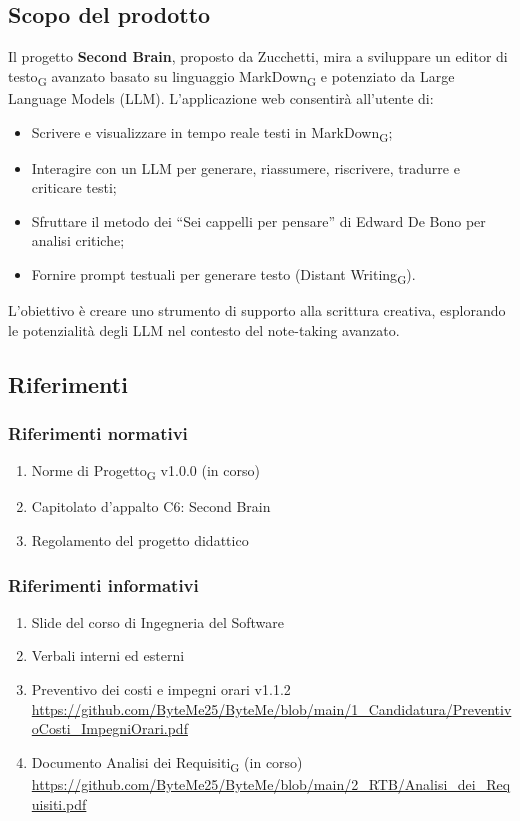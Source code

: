 \documentclass[11pt,a4paper]{article}
\newcommand{\gls}[1]{#1\textsubscript{G}}
\begin{document}
\subsection{Scopo del prodotto}
Il progetto \textbf{Second Brain}, proposto da Zucchetti, mira a sviluppare un \gls{editor di testo} avanzato basato su linguaggio \gls{MarkDown} e potenziato da Large Language Models (LLM). L’applicazione web consentirà all’utente di:
\begin{itemize}
    \item Scrivere e visualizzare in tempo reale testi in \gls{MarkDown};
    \item Interagire con un LLM per generare, riassumere, riscrivere, tradurre e criticare testi;
    \item Sfruttare il metodo dei “Sei cappelli per pensare” di Edward De Bono per analisi critiche;
    \item Fornire prompt testuali per generare testo (\gls{Distant Writing}).
\end{itemize}
L’obiettivo è creare uno strumento di supporto alla scrittura creativa, esplorando le potenzialità degli LLM nel contesto del note-taking avanzato.

\subsection{Riferimenti}
\subsubsection{Riferimenti normativi}
\begin{enumerate}
    \item \gls{Norme di Progetto} v1.0.0 (in corso)
    \item Capitolato d’appalto C6: Second Brain
    \item Regolamento del progetto didattico
\end{enumerate}

\subsubsection{Riferimenti informativi}
\begin{enumerate}
    \item Slide del corso di Ingegneria del Software
    \item Verbali interni ed esterni
    \item Preventivo dei costi e impegni orari v1.1.2 
    \url{https://github.com/ByteMe25/ByteMe/blob/main/1_Candidatura/PreventivoCosti_ImpegniOrari.pdf}
    \item Documento \gls{Analisi dei Requisiti} (in corso) 
    \url{https://github.com/ByteMe25/ByteMe/blob/main/2_RTB/Analisi_dei_Requisiti.pdf}
\end{enumerate}
\end{document}
